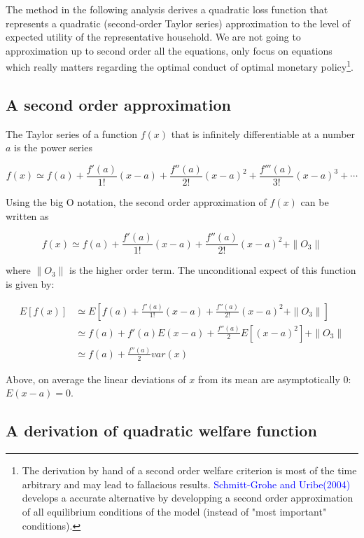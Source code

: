\documentclass[cn,10pt,math=newtx,citestyle=gb7714-2015,bibstyle=gb7714-2015]{elegantbook}
\begin{document}
	The method in the following analysis derives a quadratic loss function that represents a quadratic (second-order Taylor series) approximation to the level of expected utility of the representative household. We are not going to approximation up to second order all the equations, only focus on equations which really matters regarding the optimal conduct of optimal monetary policy\footnote{The derivation by hand of a second order welfare criterion is most of the time arbitrary and may lead to fallacious results. \textcolor{blue}{Schmitt-Grohe and Uribe(2004)} develops a accurate alternative by developping a second order approximation of all equilibrium conditions of the model (instead of "most important" conditions).}.
	
	\subsection{A second order approximation}
	
	The Taylor series of a function $f(x)$ that is infinitely differentiable at a number $a$ is the power series
	
	$$f(x)\simeq f(a)+ \frac{f'(a)}{1!}(x-a)+\frac{f''(a)}{2!}(x-a)^2+\frac{f'''(a)}{3!}(x-a)^3+\cdots$$
	
	Using the big O notation, the second order approximation of $f(x)$ can be written as
	
	$$f(x)\simeq f(a)+ \frac{f'(a)}{1!}(x-a)+\frac{f''(a)}{2!}(x-a)^2+\parallel O_3\parallel$$
	
	where $\parallel O_3\parallel$ is the higher order term. The unconditional expect of this function is given by:
	
	\begin{equation*}
		\begin{split}
			E[f(x)] &\simeq E\left[f(a)+ \frac{f'(a)}{1!}(x-a)+\frac{f''(a)}{2!}(x-a)^2+\parallel O_3\parallel\right]\\
			&\simeq f(a)+f'(a)E(x-a)+\frac{f''(a)}{2}E[(x-a)^2]+\parallel O_3\parallel\\
			&\simeq f(a)+\frac{f''(a)}{2}var(x)
		\end{split}
	\end{equation*}
	
	Above, on average the linear deviations of $x$ from its mean are asymptotically 0: $E(x-a)=0$.
	
	\subsection{A derivation of quadratic welfare function}
	
\end{document}
